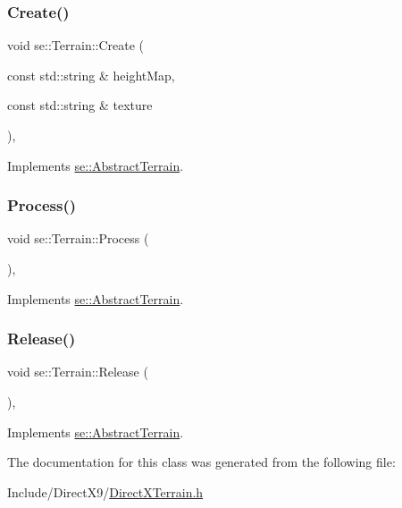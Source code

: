 \subsubsection{\texorpdfstring{Create()}{Create()}}
{\footnotesize\ttfamily void se\+::\+Terrain\+::\+Create (\begin{DoxyParamCaption}\item[{const std\+::string \&}]{height\+Map,  }\item[{const std\+::string \&}]{texture }\end{DoxyParamCaption})\hspace{0.3cm}{\ttfamily [override]}, {\ttfamily [virtual]}}



Implements \mbox{\hyperlink{classse_1_1_abstract_terrain_ac8254489e68bcfc1960b968afeb683b0}{se\+::\+Abstract\+Terrain}}.

\mbox{\label{classse_1_1_terrain_aa4eeb1886f46d2f33e1633b6f7c7345c}} 
\subsubsection{\texorpdfstring{Process()}{Process()}}
{\footnotesize\ttfamily void se\+::\+Terrain\+::\+Process (\begin{DoxyParamCaption}{ }\end{DoxyParamCaption})\hspace{0.3cm}{\ttfamily [override]}, {\ttfamily [virtual]}}



Implements \mbox{\hyperlink{classse_1_1_abstract_terrain_af2f0249eead2b62a82baa2ecbb52efeb}{se\+::\+Abstract\+Terrain}}.

\mbox{\label{classse_1_1_terrain_a61004e3426795d93190fe8d1f4159759}} 
\subsubsection{\texorpdfstring{Release()}{Release()}}
{\footnotesize\ttfamily void se\+::\+Terrain\+::\+Release (\begin{DoxyParamCaption}{ }\end{DoxyParamCaption})\hspace{0.3cm}{\ttfamily [override]}, {\ttfamily [virtual]}}



Implements \mbox{\hyperlink{classse_1_1_abstract_terrain_aeee5b6c81be6aee211819b8d79718bf5}{se\+::\+Abstract\+Terrain}}.



The documentation for this class was generated from the following file\+:\begin{DoxyCompactItemize}
\item 
Include/\+Direct\+X9/\mbox{\hyperlink{_direct_x_terrain_8h}{Direct\+X\+Terrain.\+h}}\end{DoxyCompactItemize}
